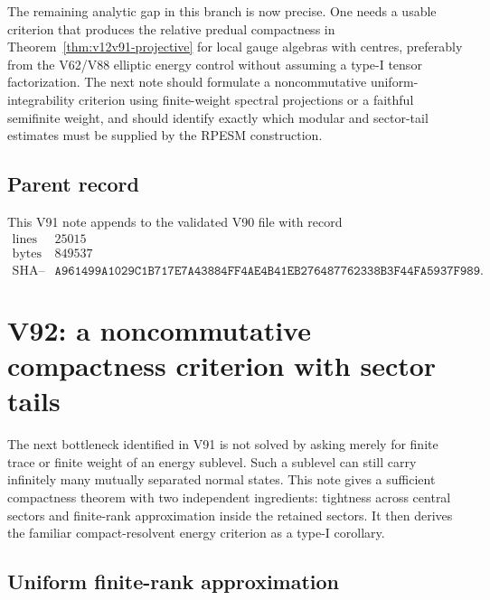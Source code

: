 \documentclass[11pt]{article}
\theoremstyle{remark}
\begin{document}
The remaining analytic gap in this branch is now precise.  One needs
a usable criterion that produces the relative predual compactness in
Theorem~\ref{thm:v12v91-projective} for local gauge algebras with
centres, preferably from the V62/V88 elliptic energy control without
assuming a type-I tensor factorization.  The next note should
formulate a noncommutative uniform-integrability criterion using
finite-weight spectral projections or a faithful semifinite weight,
and should identify exactly which modular and sector-tail estimates
must be supplied by the RPESM construction.

\subsection{Parent record}

This V91 note appends to the validated V90 file with record
\[
\begin{array}{c|c}
\text{lines}&25015\\
\text{bytes}&849537\\
\text{SHA--256}&
\texttt{A961499A1029C1B717E7A43884FF4AE4B41EB276487762338B3F44FA5937F989}.
\end{array}
\]



\section{V92: a noncommutative compactness criterion with sector
tails}
\label{sec:v12v92}

The next bottleneck identified in V91 is not solved by asking merely
for finite trace or finite weight of an energy sublevel.  Such a
sublevel can still carry infinitely many mutually separated normal
states.  This note gives a sufficient compactness theorem with two
independent ingredients: tightness across central sectors and
finite-rank approximation inside the retained sectors.  It then
derives the familiar compact-resolvent energy criterion as a
type-I corollary.

\subsection{Uniform finite-rank approximation}
\end{document}

